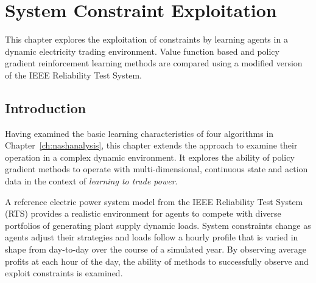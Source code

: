 \chapter{System Constraint Exploitation}
\label{ch:exploitation}
This chapter explores the exploitation of constraints by learning agents in a
dynamic electricity trading environment.  Value function based and policy
gradient reinforcement learning methods are compared using a modified version
of the IEEE Reliability Test System.

\section{Introduction}
Having examined the basic learning characteristics of four algorithms in
Chapter~\ref{ch:nashanalysis}, this chapter extends the approach to examine
their operation in a complex dynamic environment.  It explores the ability of
policy gradient methods to operate with multi-dimensional, continuous state and
action data in the context of \textit{learning to trade power}.

A reference electric power system model from the IEEE Reliability Test System
(RTS) \cite{ieee79rts} provides a realistic environment for agents to compete
with diverse portfolios of generating plant supply dynamic loads.  System
constraints change as agents adjust their strategies and loads follow a hourly
profile that is varied in shape from day-to-day over the course of a simulated
year. By observing average profits at each hour of the day, the ability of
methods to successfully observe and exploit constraints is examined.

